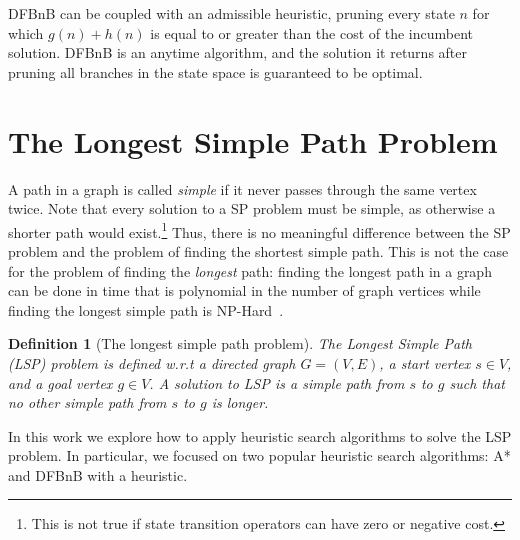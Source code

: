 \documentclass[letterpaper]{article} %
\newcommand\Yossi[1]{\nb{\textbf{Yossi:}}{green}{#1}}
\newcommand\Roni[1]{\nb{\textbf{Roni:}}{blue}{#1}}
\newtheorem{definition}{Definition}
\begin{document}
DFBnB can be coupled with an admissible heuristic, pruning every state $n$ for which $g(n)+h(n)$ is equal to or greater than
the cost of the incumbent solution. DFBnB is an anytime algorithm, and the solution it returns after pruning all branches in the state space is guaranteed to be optimal. 



\section{The Longest Simple Path Problem}
A path in a graph is called \emph{simple} if it never passes through the same vertex twice. Note that every solution to a SP problem must be simple, as otherwise a shorter path would exist.\footnote{This is not true if state transition operators can have zero or negative cost.} Thus, there is no meaningful difference between the SP problem and the problem of finding the shortest simple path. This is not the case for the problem of finding the \emph{longest} path: finding the longest path in a graph can be done in time that is polynomial in the number of graph vertices while finding the longest simple path is NP-Hard~\cite{karger1997approximating}. 


\begin{definition}[The longest simple path problem]
The Longest Simple Path (LSP) problem is defined w.r.t a directed graph $G=(V,E)$, a start vertex $s\in V$, and a goal vertex $g\in V$. A solution to LSP is a simple path from $s$ to $g$ such that no other simple path from $s$ to $g$ is longer. 
\end{definition}

In this work we explore how to apply heuristic search algorithms to solve the LSP problem. 
In particular, we focused on two popular heuristic search algorithms: A* and DFBnB with a heuristic.
\end{document}
